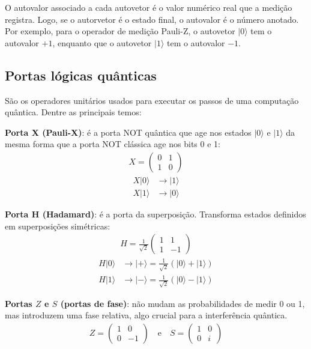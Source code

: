 \documentclass[12pt, a4paper]{article}
\newcommand{\ket}[1]{\lvert #1 \rangle}
\begin{document}
O autovalor associado a cada autovetor é o valor numérico real que a medição registra. Logo, se o autorvetor é o estado final, o autovalor é o número anotado. Por exemplo, para o operador de medição Pauli-Z, o autovetor $\ket{0}$ tem o autovalor $+1$, enquanto que o autovetor $\ket{1}$ tem o autovalor $-1$. 

\subsection{Portas lógicas quânticas}
São os operadores unitários usados para executar os passos de uma computação quântica. Dentre as principais temos: 

{\bf Porta X (Pauli-X)}: é a porta NOT quântica que age nos estados $\ket{0}$ e $\ket{1}$ da mesma forma que a porta NOT clássica age nos bits 0 e 1:
\begin{align}
    X = \begin{pmatrix}
        0 & 1 \\
        1 & 0
    \end{pmatrix}    
\end{align} 
\begin{align}
    X\ket{0} &\longrightarrow \ket{1} \\ 
    X\ket{1} &\longrightarrow \ket{0}
\end{align}

{\bf Porta H (Hadamard)}: é a porta da superposição. Transforma estados definidos em superposições simétricas:
\begin{align}
    H = \frac{1}{\sqrt{2}}\begin{pmatrix}
        1 & 1 \\
        1 & -1
    \end{pmatrix}    
\end{align} 
\begin{align}
    H\ket{0} &\longrightarrow \ket{+} = \frac{1}{\sqrt{2}}(\ket{0} + \ket{1}) \\ 
    H\ket{1} &\longrightarrow \ket{-} = \frac{1}{\sqrt{2}}(\ket{0} - \ket{1})
\end{align}

{\bf Portas $Z$ e $S$ (portas de fase)}: não mudam as probabilidades de medir 0 ou 1, mas introduzem uma fase relativa, algo crucial para a interferência quântica.
\begin{align}
    Z = \begin{pmatrix}
        1 & 0 \\
        0 & -1
    \end{pmatrix}
    \quad\mbox{e}\quad
    S = \begin{pmatrix}
        1 & 0 \\
        0 & i
    \end{pmatrix}
\end{align} 
\end{document}
